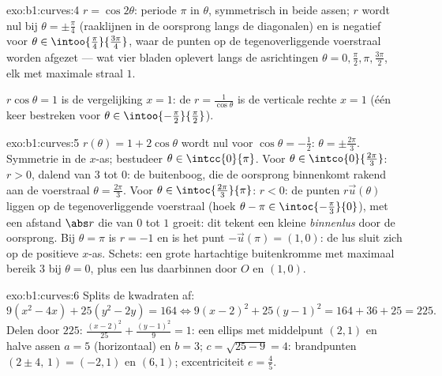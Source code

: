 \begin{solution}{exo:b1:curves:4}
$r = \cos 2\theta$: periode $\pi$ in $\theta$, symmetrisch in beide
assen; $r$ wordt nul bij $\theta = \pm\frac\pi4$ (raaklijnen in de
oorsprong langs de diagonalen) en is negatief voor $\theta \in
\intoo{\frac\pi4}{\frac{3\pi}{4}}$, waar de punten op de
tegenoverliggende voerstraal worden afgezet --- wat vier bladen
oplevert langs de asrichtingen $\theta = 0, \frac\pi2, \pi,
\frac{3\pi}{2}$, elk met maximale straal $1$.

$r\cos\theta = 1$ is de vergelijking $x = 1$: de  $r =
\frac{1}{\cos\theta}$ is de verticale rechte $x = 1$ (één keer
bestreken voor $\theta \in \intoo{-\frac\pi2}{\frac\pi2}$).
\end{solution}

\begin{solution}{exo:b1:curves:5}
$r(\theta) = 1 + 2\cos\theta$ wordt nul voor $\cos\theta =
-\frac12$: $\theta = \pm\frac{2\pi}{3}$. Symmetrie in de $x$-as;
bestudeer $\theta \in \intcc{0}{\pi}$. Voor $\theta \in
\intco{0}{\frac{2\pi}{3}}$: $r > 0$, dalend van $3$ tot $0$: de
buitenboog, die de oorsprong binnenkomt rakend aan de voerstraal
$\theta = \frac{2\pi}{3}$. Voor $\theta \in
\intoc{\frac{2\pi}{3}}{\pi}$: $r < 0$: de punten $r\vec u(\theta)$
liggen op de tegenoverliggende voerstraal (hoek $\theta - \pi \in
\intoc{-\frac\pi3}{0}$), met een afstand $\abs r$ die van $0$ tot
$1$ groeit: dit tekent een kleine \emph{binnenlus} door de
oorsprong. Bij $\theta = \pi$ is $r = -1$ en is het punt $-\vec
u(\pi) = (1, 0)$: de lus sluit zich op de positieve $x$-as. Schets:
een grote hartachtige buitenkromme met maximaal bereik $3$ bij
$\theta = 0$, plus een lus daarbinnen door $O$ en $(1,0)$.
\end{solution}

\begin{solution}{exo:b1:curves:6}
Splits de kwadraten af:
\[
9(x^2 - 4x) + 25(y^2 - 2y) = 164
\iff 9(x-2)^2 + 25(y-1)^2 = 164 + 36 + 25 = 225 .
\]
Delen door $225$: $\frac{(x-2)^2}{25} + \frac{(y-1)^2}{9} = 1$: een
ellips met middelpunt $(2, 1)$ en halve assen $a = 5$ (horizontaal)
en $b = 3$; $c = \sqrt{25 - 9} = 4$: brandpunten $(2 \pm 4,\, 1) =
(-2, 1)$ en $(6, 1)$; excentriciteit $e = \frac45$.
\end{solution}


